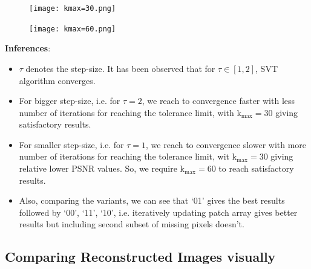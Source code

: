 \documentclass[fleqn, 11pt]{article}
\begin{document}
\begin{figure}[H]
    \centering
    \texttt{[image: kmax=30.png]}
\end{figure}

\begin{figure}[H]
    \centering
    \texttt{[image: kmax=60.png]}
\end{figure}

\textbf{Inferences}:

\begin{itemize}
    \item $\tau$ denotes the step-size. It has been observed that for $\tau \in [1, 2]$, SVT algorithm converges.
    \item For bigger step-size, i.e. for $\tau = 2$, we reach to convergence faster with less number of iterations for reaching the tolerance limit, with k$_\text{max} = 30$ giving satisfactory results.
    \item For smaller step-size, i.e. for $\tau = 1$, we reach to convergence slower with more number of iterations for reaching the tolerance limit, wit k$_\text{max} = 30$ giving relative lower PSNR values. So, we require k$_\text{max} = 60$ to reach satisfactory results.
    \item Also, comparing the variants, we can see that `01' gives the best results followed by `00', `11', `10', i.e. iteratively updating patch array gives better results but including second subset of missing pixels doesn't.
\end{itemize}

\newpage
\subsection*{Comparing Reconstructed Images visually}
\end{document}
